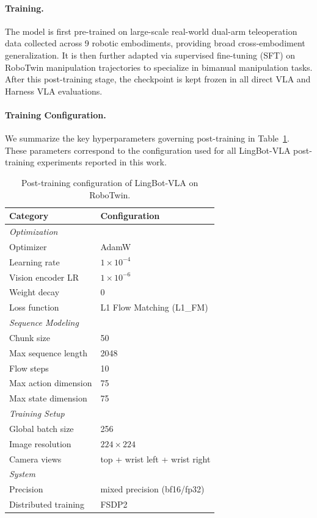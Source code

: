 \documentclass[11pt]{article}
\begin{document}
\paragraph{Training.}
The model is first pre-trained on large-scale real-world dual-arm teleoperation data collected across 9 robotic embodiments, providing broad cross-embodiment generalization. It is then further adapted via supervised fine-tuning (SFT) on RoboTwin manipulation trajectories to specialize in bimanual manipulation tasks. After this post-training stage, the checkpoint is kept frozen in all direct VLA and Harness VLA evaluations.

\paragraph{Training Configuration.}
We summarize the key hyperparameters governing post-training in Table~\ref{tab:lingbot_hyperparams}. These parameters correspond to the configuration used for all LingBot-VLA post-training experiments reported in this work.

\begin{table}[h]
\centering
\caption{Post-training configuration of LingBot-VLA on RoboTwin.}
\label{tab:lingbot_hyperparams}
\begin{tabular}{ll}
\toprule
\textbf{Category} & \textbf{Configuration} \\
\midrule
\multicolumn{2}{l}{\textit{Optimization}} \\
Optimizer & AdamW \\
Learning rate & $1 \times 10^{-4}$ \\
Vision encoder LR & $1 \times 10^{-6}$ \\
Weight decay & 0 \\
Loss function & L1 Flow Matching (L1\_FM) \\
\midrule
\multicolumn{2}{l}{\textit{Sequence Modeling}} \\
Chunk size & 50 \\
Max sequence length & 2048 \\
Flow steps & 10 \\
Max action dimension & 75 \\
Max state dimension & 75 \\
\midrule
\multicolumn{2}{l}{\textit{Training Setup}} \\
Global batch size & 256 \\
Image resolution & $224 \times 224$ \\
Camera views & top + wrist left + wrist right \\
\midrule
\multicolumn{2}{l}{\textit{System}} \\
Precision & mixed precision (bf16/fp32) \\
Distributed training & FSDP2 \\
\bottomrule
\end{tabular}
\end{table}
\end{document}
